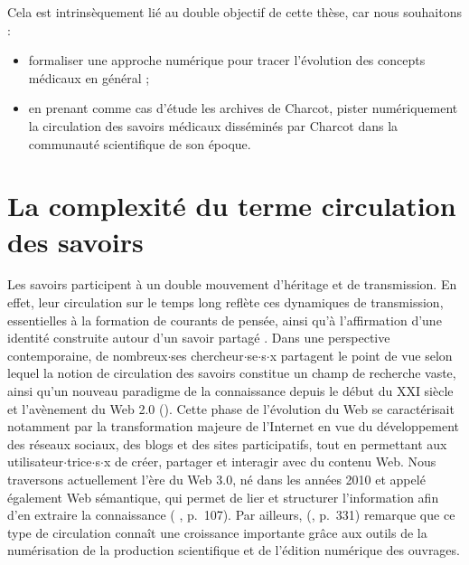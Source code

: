 Cela est intrinsèquement lié au double objectif de cette thèse, car nous souhaitons :
\begin{itemize} 
	\item formaliser une approche numérique pour tracer l'évolution des concepts médicaux en général ;
	\item en prenant comme cas d'étude les archives de Charcot, pister numériquement la circulation des savoirs médicaux disséminés par Charcot dans la communauté scientifique de son époque.
\end{itemize}
\medskip








\section{La complexité du terme \og{}circulation des savoirs\fg{}}
\label{sect:modalites_circulations}
Les savoirs participent à un double mouvement d'héritage et de transmission. En effet, leur circulation sur le temps long reflète ces dynamiques de transmission, essentielles à la formation de courants de pensée, ainsi qu'à l'affirmation d’une identité construite autour d'un savoir partagé \citep[p.~251]{adell2011chapitre}. Dans une perspective contemporaine, de nombreux$\cdot$ses chercheur$\cdot$se$\cdot$s$\cdot$x partagent le point de vue selon lequel la notion de circulation des savoirs constitue un champ de recherche vaste, ainsi qu'un nouveau paradigme de la connaissance depuis le début du XXI\ieme{} siècle et l'avènement du Web \textsc{2.0} (\citealp{landais2014frederic,quet2014frederic}). Cette phase de l'évolution du Web se caractérisait notamment par la transformation majeure de l'Internet en vue du développement des réseaux sociaux, des blogs et des sites participatifs, tout en permettant aux utilisateur$\cdot$trice$\cdot$s$\cdot$x de créer, partager et interagir avec du contenu Web. Nous traversons actuellement l'ère du Web \textsc{3.0}, né dans les années 2010 et appelé également \og{}Web sémantique\fg{}, qui permet de lier et structurer l'information afin d'en extraire la connaissance (\citeauthor{andrade2013sociologie} \citeyear{andrade2013sociologie}, p.~107). Par ailleurs, \citeauthor{landais2014frederic} (\citeyear{landais2014frederic}, p.~331) remarque que ce type de circulation connaît une croissance importante grâce aux outils de la numérisation de la production scientifique et de l'édition numérique des ouvrages.

